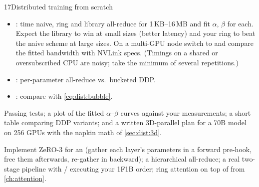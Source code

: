 \begin{labbox}{17}{Distributed training from scratch}
\begin{itemize}
\item {}: time naive, ring and library all-reduce for
  1\,KB--16\,MB and fit $\alpha$, $\beta$ for each. Expect the library to win at small sizes
  (better latency) and your ring to beat the naive scheme at large sizes. On a multi-GPU node
  switch to  and compare the fitted bandwidth with NVLink specs. (Timings on
  a shared or oversubscribed CPU are noisy; take the minimum of several repetitions.)
\item {}: per-parameter all-reduce vs.\ bucketed DDP.
\item {}: compare with \cref{eq:dist:bubble}.
\end{itemize}

Passing tests; a plot of the fitted $\alpha$--$\beta$ curves against your measurements; a short
table comparing DDP variants; and a written 3D-parallel plan for a 70B model on 256 GPUs with
the napkin math of \cref{sec:dist:3d}.

Implement ZeRO-3 for an  (gather each layer's parameters in a forward
pre-hook, free them afterwards, re-gather in backward); a hierarchical all-reduce; a real
two-stage pipeline with / executing your 1F1B order; ring
attention on top of  from \cref{ch:attention}.
\end{labbox}
